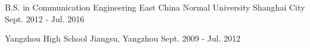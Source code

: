 


\begin{cventries}


\cventry
{B.S. in Communication Engineering} %
{East China Normal University} %
{Shanghai City} %
{Sept. 2012 - Jul. 2016} %
{ %
}

\cventry
{}
{Yangzhou High School}
{Jiangsu, Yangzhou}
{Sept. 2009 - Jul. 2012} %
{ %
}


\end{cventries}